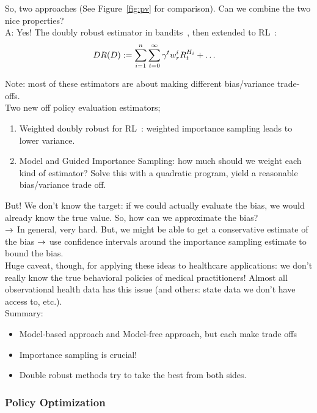 So, two approaches (See Figure~\ref{fig:pv} for comparison). Can we combine the two nice properties? \\

A: Yes! The doubly robust estimator in bandits~\cite{dudik2011doubly}, then extended to RL~\cite{jiang2015doubly}:
\begin{align}
DR(D) &:= \sum_{i = 1}^n \sum_{t=0}^\infty \gamma^t w_r^i R_t^{H_i} + \ldots
\end{align}

Note: most of these estimators are about making different bias/variance trade-offs. \\

Two new off policy evaluation estimators;
\begin{enumerate}
    \item Weighted doubly robust for RL~\cite{thomas2016data}: weighted importance sampling leads to lower variance.
    \item Model and Guided Importance Sampling: how much should we weight each kind of estimator? Solve this with a quadratic program, yield a reasonable bias/variance trade off.
\end{enumerate}

But! We don't know the target: if we could actually evaluate the bias, we would already know the true value. So, how can we approximate the bias? \\

$\rightarrow$ In general, very hard. But, we might be able to get a conservative estimate of the bias $\rightarrow$ use confidence intervals around the importance sampling estimate to bound the bias. \\

Huge caveat, though, for applying these ideas to healthcare applications: we don't really know the true behavioral policies of medical practitioners! Almost all observational health data has this issue (and others: state data we don't have access to, etc.). \\

Summary:
\begin{itemize}
    \item Model-based approach and Model-free approach, but each make trade offs
    \item Importance sampling is crucial!
    \item Double robust methods try to take the best from both sides.
\end{itemize}


\subsubsection{Policy Optimization}

